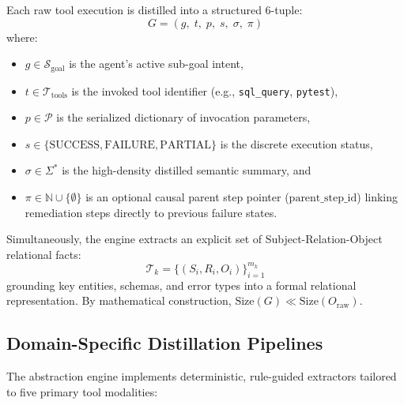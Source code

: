 \documentclass[lettersize,journal]{IEEEtran}
\begin{document}
Each raw tool execution is distilled into a structured 6-tuple:
\begin{equation}
\label{eq:tuple_full}
G = (g,\; t,\; p,\; s,\; \sigma,\; \pi)
\end{equation}
where:
\begin{itemize}
    \item $g \in \mathcal{S}_{\text{goal}}$ is the agent's active sub-goal intent,
    \item $t \in \mathcal{T}_{\text{tools}}$ is the invoked tool identifier (e.g., \texttt{sql\_query}, \texttt{pytest}),
    \item $p \in \mathcal{P}$ is the serialized dictionary of invocation parameters,
    \item $s \in \{\text{SUCCESS}, \text{FAILURE}, \text{PARTIAL}\}$ is the discrete execution status,
    \item $\sigma \in \Sigma^*$ is the high-density distilled semantic summary, and
    \item $\pi \in \mathbb{N} \cup \{\emptyset\}$ is an optional causal parent step pointer ($\text{parent\_step\_id}$) linking remediation steps directly to previous failure states.
\end{itemize}

Simultaneously, the engine extracts an explicit set of Subject-Relation-Object relational facts:
\begin{equation}
\label{eq:triples}
\mathcal{T}_k = \{(S_i, R_i, O_i)\}_{i=1}^{m_k}
\end{equation}
grounding key entities, schemas, and error types into a formal relational representation. By mathematical construction, $\text{Size}(G) \ll \text{Size}(O_{\text{raw}})$.

\subsection{Domain-Specific Distillation Pipelines}

The abstraction engine implements deterministic, rule-guided extractors tailored to five primary tool modalities:
\end{document}
